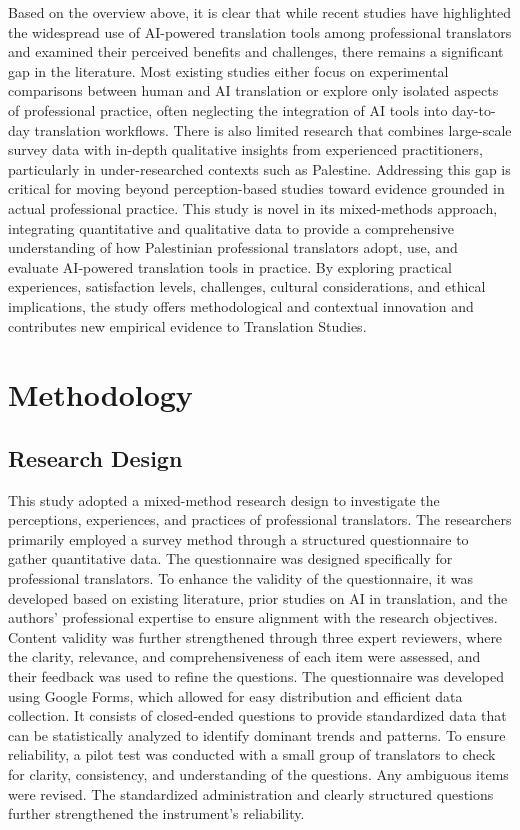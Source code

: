 \documentclass[english]{textolivre}
\begin{document}
Based on the overview above, it is clear that while recent studies have highlighted the widespread use of AI-powered translation tools among professional translators and examined their perceived benefits and challenges, there remains a significant gap in the literature. Most existing studies either focus on experimental comparisons between human and AI translation or explore only isolated aspects of professional practice, often neglecting the integration of AI tools into day-to-day translation workflows. There is also limited research that combines large-scale survey data with in-depth qualitative insights from experienced practitioners, particularly in under-researched contexts such as Palestine. Addressing this gap is critical for moving beyond perception-based studies toward evidence grounded in actual professional practice. This study is novel in its mixed-methods approach, integrating quantitative and qualitative data to provide a comprehensive understanding of how Palestinian professional translators adopt, use, and evaluate AI-powered translation tools in practice. By exploring practical experiences, satisfaction levels, challenges, cultural considerations, and ethical implications, the study offers methodological and contextual innovation and contributes new empirical evidence to Translation Studies.

\section{Methodology}\label{sec-organizacao-latex}

\subsection{Research Design}\label{sec-titulo}
This study adopted a mixed-method research design to investigate the perceptions, experiences, and practices of professional translators. The researchers primarily employed a survey method through a structured questionnaire to gather quantitative data. The questionnaire was designed specifically for professional translators. To enhance the validity of the questionnaire, it was developed based on existing literature, prior studies on AI in translation, and the authors’ professional expertise to ensure alignment with the research objectives. Content validity was further strengthened through three expert reviewers, where the clarity, relevance, and comprehensiveness of each item were assessed, and their feedback was used to refine the questions. The questionnaire was developed using Google Forms, which allowed for easy distribution and efficient data collection. It consists of closed-ended questions to provide standardized data that can be statistically analyzed to identify dominant trends and patterns. To ensure reliability, a pilot test was conducted with a small group of translators to check for clarity, consistency, and understanding of the questions. Any ambiguous items were revised. The standardized administration and clearly structured questions further strengthened the instrument’s reliability.
\end{document}
